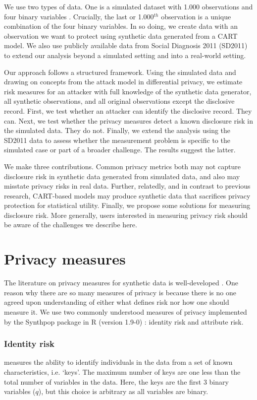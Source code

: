 \documentclass[runningheads]{llncs}
\begin{document}
We use two types of data. One is a simulated dataset with 1.000 observations and four binary variables \cite{reiter2014bayesian}. Crucially, the last or 1.000$^{th}$ observation is a unique combination of the four binary variables.  In so doing, we create data with an observation we want to protect using synthetic data generated from a CART model.  We also use publicly available data from Social Diagnosis 2011 (SD2011) to extend our analysis beyond a simulated setting and into a real-world setting.

Our approach follows a structured framework. Using the simulated data and drawing on concepts from the attack model in differential privacy, we estimate risk measures for an attacker with full knowledge of the synthetic data generator, all synthetic observations, and all original observations except the disclosive record.  First, we test whether an attacker can identify the disclosive record.  They can.  Next, we test whether the privacy measures detect a known disclosure risk in the simulated data. They do not.  Finally, we extend the analysis using the SD2011 data to assess whether the measurement problem is specific to the simulated case or part of a broader challenge. The results suggest the latter.

We make three contributions.  Common privacy metrics both may not capture disclosure risk in synthetic data generated from simulated data, and also may misstate privacy risks in real data.  Further, relatedly, and in contrast to previous research, CART-based models may produce synthetic data that sacrifices privacy protection for statistical utility.  Finally, we propose some solutions for measuring disclosure risk.  More generally, users interested in measuring privacy risk should be aware of the challenges we describe here.

\section{Privacy measures}

The literature on privacy measures for synthetic data is well-developed \cite{wagner2018technical}.  One reason why there are so many measures of privacy is because there is no one agreed upon understanding of either what defines risk nor how one should measure it.  We use two commonly understood measures of privacy implemented by the Synthpop package in R (version 1.9-0) \cite{raab2024practical}: identity risk and attribute risk.  

\subsubsection{Identity risk} measures the ability to identify individuals in the data from a set of known characteristics, i.e. `keys'. The maximum number of keys are one less than the total number of variables in the data.  Here, the keys are the first 3 binary variables ($q$), but this choice is arbitrary as all variables are binary.  
\end{document}
